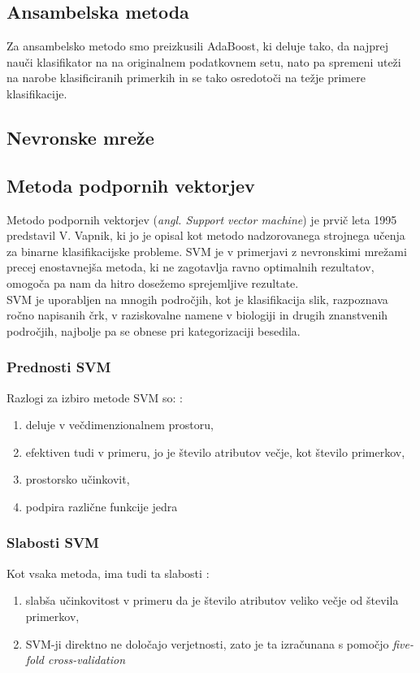 \documentclass{acm_proc_article-sp}
\begin{document}
\subsection{Ansambelska metoda}
Za ansambelsko metodo smo preizkusili AdaBoost, ki deluje tako, da najprej nauči klasifikator na na originalnem podatkovnem setu, nato pa spremeni uteži na narobe klasificiranih primerkih in se tako osredotoči na težje primere klasifikacije. \cite{SciAda}


\subsection{Nevronske mreže}


\subsection{Metoda podpornih vektorjev}
Metodo podpornih  vektorjev (\textit{angl. Support vector machine}) je prvič leta 1995 predstavil V. Vapnik\cite{Vapnik}, ki jo je opisal kot metodo nadzorovanega strojnega učenja za binarne klasifikacijske probleme. SVM je v primerjavi z nevronskimi mrežami precej enostavnejša metoda, ki ne zagotavlja ravno optimalnih rezultatov, omogoča pa nam da hitro dosežemo sprejemljive rezultate\cite{Hsu}.\\
SVM je uporabljen na mnogih področjih, kot je klasifikacija slik, razpoznava ročno napisanih črk, v raziskovalne namene v biologiji in drugih znanstvenih področjih, najbolje pa se obnese pri kategorizaciji besedila\cite{Wiki_svm}.\\
\subsubsection{Prednosti SVM}
Razlogi za izbiro metode SVM so: \cite{SciDev}:
\begin{enumerate}
\item{deluje v večdimenzionalnem prostoru,}
\item{efektiven tudi v primeru, jo je število atributov večje, kot število primerkov,}
\item{prostorsko učinkovit,}
\item{podpira različne funkcije jedra}
\end{enumerate}

\subsubsection{Slabosti SVM}
Kot vsaka metoda, ima tudi ta slabosti \cite{SciDev}:
\begin{enumerate}
\item{slabša učinkovitost v primeru da je število atributov veliko večje od števila primerkov,}
\item{SVM-ji direktno ne določajo verjetnosti, zato je ta izračunana s pomočjo \textit{five-fold cross-validation}}
\end{enumerate}
\end{document}
